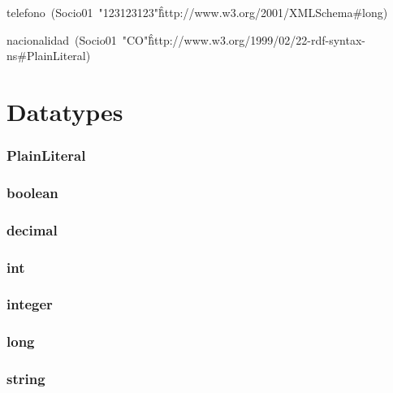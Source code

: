 \documentclass{article}
\begin{document}
telefono~(Socio01~"123123123"\^\^http://www.w3.org/2001/XMLSchema#long)

nacionalidad~(Socio01~"CO"\^\^http://www.w3.org/1999/02/22-rdf-syntax-ns#PlainLiteral)

\section*{Datatypes}\subsubsection*{PlainLiteral}

\subsubsection*{boolean}

\subsubsection*{decimal}

\subsubsection*{int}

\subsubsection*{integer}

\subsubsection*{long}

\subsubsection*{string}
\end{document}
